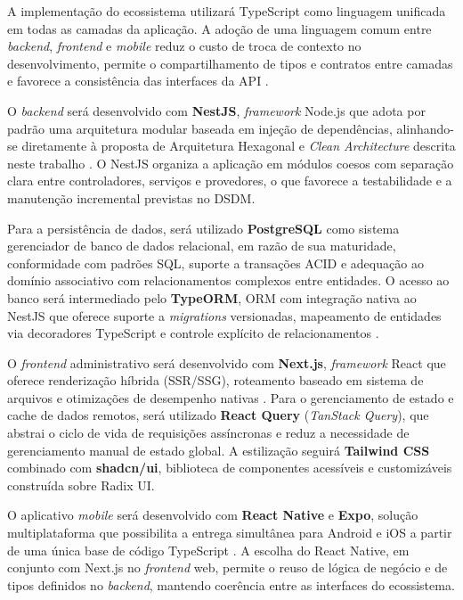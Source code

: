﻿\documentclass[12pt,a4paper]{article}
\begin{document}
A implementação do ecossistema utilizará TypeScript como linguagem unificada em todas as camadas da aplicação. A adoção de uma linguagem comum entre \textit{backend}, \textit{frontend} e \textit{mobile} reduz o custo de troca de contexto no desenvolvimento, permite o compartilhamento de tipos e contratos entre camadas e favorece a consistência das interfaces da API \citep{bierman2014}.

O \textit{backend} será desenvolvido com \textbf{NestJS}, \textit{framework} Node.js que adota por padrão uma arquitetura modular baseada em injeção de dependências, alinhando-se diretamente à proposta de Arquitetura Hexagonal e \textit{Clean Architecture} descrita neste trabalho \citep{nestjs2023}. O NestJS organiza a aplicação em módulos coesos com separação clara entre controladores, serviços e provedores, o que favorece a testabilidade e a manutenção incremental previstas no DSDM.

Para a persistência de dados, será utilizado \textbf{PostgreSQL} como sistema gerenciador de banco de dados relacional, em razão de sua maturidade, conformidade com padrões SQL, suporte a transações ACID e adequação ao domínio associativo com relacionamentos complexos entre entidades. O acesso ao banco será intermediado pelo \textbf{TypeORM}, ORM com integração nativa ao NestJS que oferece suporte a \textit{migrations} versionadas, mapeamento de entidades via decoradores TypeScript e controle explícito de relacionamentos \citep{typeorm2023}.

O \textit{frontend} administrativo será desenvolvido com \textbf{Next.js}, \textit{framework} React que oferece renderização híbrida (SSR/SSG), roteamento baseado em sistema de arquivos e otimizações de desempenho nativas \citep{nextjs2023}. Para o gerenciamento de estado e cache de dados remotos, será utilizado \textbf{React Query} (\textit{TanStack Query}), que abstrai o ciclo de vida de requisições assíncronas e reduz a necessidade de gerenciamento manual de estado global. A estilização seguirá \textbf{Tailwind CSS} combinado com \textbf{shadcn/ui}, biblioteca de componentes acessíveis e customizáveis construída sobre Radix UI.

O aplicativo \textit{mobile} será desenvolvido com \textbf{React Native} e \textbf{Expo}, solução multiplataforma que possibilita a entrega simultânea para Android e iOS a partir de uma única base de código TypeScript \citep{expo2023}. A escolha do React Native, em conjunto com Next.js no \textit{frontend} web, permite o reuso de lógica de negócio e de tipos definidos no \textit{backend}, mantendo coerência entre as interfaces do ecossistema.
\end{document}
